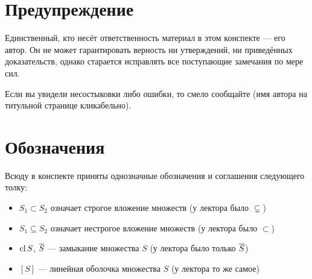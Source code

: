 \section*{Предупреждение}

Единственный, кто несёт ответственность материал в этом конспекте --- его автор. Он не может гарантировать верность ни утверждений, ни приведённых доказательств, однако старается исправлять все поступающие замечания по мере сил.

Если вы увидели несостыковки либо ошибки, то смело сообщайте (имя автора на титульной странице кликабельно).

\section*{Обозначения}

Всюду в конспекте приняты однозначные обозначения и соглашения следующего толку:

\begin{itemize}
	\item $S_1 \subset S_2$ означает строгое вложение множеств (у лектора было $\subsetneq$)
	
	\item $S_1 \subseteq S_2$ означает нестрогое вложение множеств (у лектора было $\subset$)
	
	\item $\operatorname{cl} S$, $\overline{S}$ --- замыкание множества $S$ (у лектора было только $\overline{S}$)
	
	\item $[S]$ --- линейная оболочка множества $S$ (у лектора то же самое)
\end{itemize}